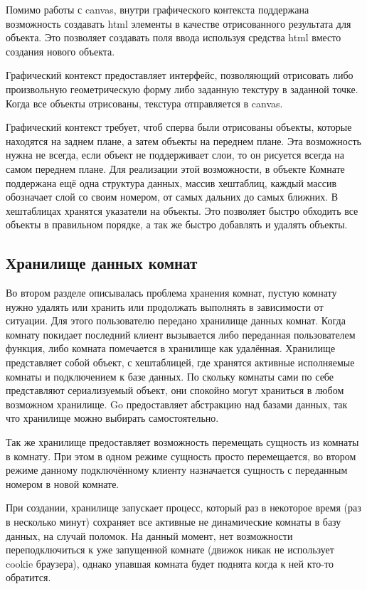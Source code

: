 \documentclass[a4paper,14pt, openany]{book}
\begin{document}
Помимо работы с canvas, внутри графического контекста поддержана возможность создавать html элементы в качестве отрисованного результата для объекта. Это позволяет создавать поля ввода используя средства html вместо создания нового объекта. 

Графический контекст предоставляет интерфейс, позволяющий отрисовать либо произвольную геометрическую форму либо заданную текстуру в заданной точке. Когда все объекты отрисованы, текстура отправляется в canvas.

Графический контекст требует, чтоб сперва были отрисованы объекты, которые находятся на заднем плане, а затем объекты на переднем плане. Эта возможность нужна не всегда, если объект не поддерживает слои, то он рисуется всегда на самом переднем плане. Для реализации этой возможности, в объекте Комнате поддержана ещё одна структура данных, массив хештаблиц, каждый массив обозначает слой со своим номером, от самых дальних до самых ближних. В хештаблицах хранятся указатели на объекты. Это позволяет быстро обходить все объекты в правильном порядке, а так же быстро добавлять и удалять объекты.

\subsection{Хранилище данных комнат}

Во втором разделе описывалась проблема хранения комнат, пустую комнату нужно удалять или хранить или продолжать выполнять в зависимости от ситуации. Для этого пользователю передано хранилище данных комнат. Когда комнату покидает последний клиент вызывается либо переданная пользователем функция, либо комната помечается в хранилище как удалённая. Хранилище представляет собой объект, с хештаблицей, где хранятся активные исполняемые комнаты и подключением к базе данных. По скольку комнаты сами по себе представляют сериализуемый объект, они спокойно могут храниться в любом возможном хранилище. Go предоставляет абстракцию над базами данных, так что хранилище можно выбирать самостоятельно.

Так же хранилище предоставляет возможность перемещать сущность из комнаты в комнату. При этом в одном режиме сущность просто перемещается, во втором режиме данному подключённому клиенту назначается сущность с
переданным номером в новой комнате.

При создании, хранилище запускает процесс, который раз в некоторое время (раз в несколько минут) сохраняет все активные не динамические комнаты в базу данных, на случай поломок. На данный момент, нет возможности переподключиться к уже запущенной комнате (движок никак не использует cookie браузера), однако упавшая комната будет поднята когда к ней кто-то обратится.
\end{document}
